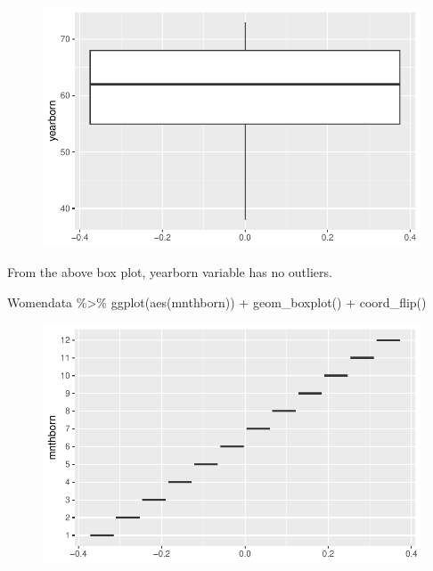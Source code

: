 \documentclass[
  letterpaper,
  DIV=11,
  numbers=noendperiod]{scrartcl}
\newenvironment{Shaded}{\begin{snugshade}}{\end{snugshade}}
\newcommand{\FunctionTok}[1]{\textcolor[rgb]{0.28,0.35,0.67}{#1}}
\newcommand{\NormalTok}[1]{\textcolor[rgb]{0.00,0.23,0.31}{#1}}
\newcommand{\SpecialCharTok}[1]{\textcolor[rgb]{0.37,0.37,0.37}{#1}}
\begin{document}
\begin{figure}[H]

{\centering \includegraphics{Fertility_Rates_Education_Impact_Botswana_files/figure-pdf/unnamed-chunk-17-1.pdf}

}

\end{figure}

From the above box plot, yearborn variable has no outliers.

\begin{Shaded}
\begin{Highlighting}[]
\NormalTok{Womendata }\SpecialCharTok{\%\textgreater{}\%}
  \FunctionTok{ggplot}\NormalTok{(}\FunctionTok{aes}\NormalTok{(mnthborn)) }\SpecialCharTok{+}
  \FunctionTok{geom\_boxplot}\NormalTok{() }\SpecialCharTok{+}
  \FunctionTok{coord\_flip}\NormalTok{()}
\end{Highlighting}
\end{Shaded}

\begin{figure}[H]

{\centering \includegraphics{Fertility_Rates_Education_Impact_Botswana_files/figure-pdf/unnamed-chunk-18-1.pdf}

}

\end{figure}
\end{document}
